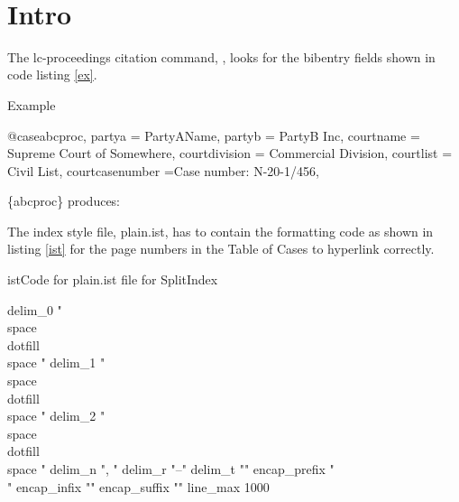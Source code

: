 
\maketitle
\tableofcontents

\let\xoldtwocolumn\twocolumn
\iftoggle{printlegtoc}{%
\let\oldtwocolumn\twocolumn
\renewcommand{\twocolumn}[1][]{#1}
\let\oldclearpage\clearpage
\renewcommand\clearpage{\relax}
\extendtheindex{}{\useindexpreamble}{}{}
\printindex[cases]
\printindex[legislation]
\iftoggle{printregulations}{\printindex[regulations]}{}
\renewcommand{\twocolumn}[1][]{\oldtwocolumn}
\renewcommand\clearpage{\oldclearpage}
}{}
\bigskip
\hfill{}\hfill\ %
\bigskip




\section{Intro}
The lc-proceedings citation command, , looks for the bibentry fields shown in code listing \ref{ex}.

\begin{dov}{ex}{Example}

@case{abcproc,
  partya = {PartyAName},
  partyb = {PartyB Inc},
  courtname = {Supreme Court of Somewhere},
  courtdivision = {Commercial Division},
  courtlist = {Civil List},
  courtcasenumber ={Case number: N-20-1/456},
}

\end{dov}

\{abcproc\} produces: 

\bigskip

The index style file, plain.ist, has to contain the formatting code as shown in listing \ref{ist} for the page numbers in the Table of Cases to hyperlink correctly.


\begin{dov}{ist}{Code for plain.ist file for SplitIndex}

delim_0 "\\space\\dotfill\\space "\hss
delim_1 "\\space\\dotfill\\space "\hss
delim_2 "\\space\\dotfill\\space "\hss
delim_n ", "
delim_r "--"
delim_t ""
encap_prefix "\\"
encap_infix "{"
encap_suffix "}"
line_max 1000

\end{dov}



